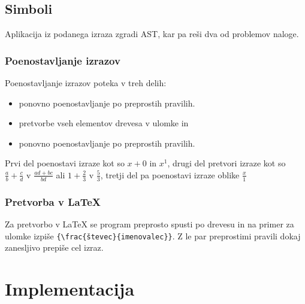 \documentclass[12pt]{report}
\begin{document}
	\section{Simboli}
	\label{symbol}
		Aplikacija iz podanega izraza zgradi AST, kar pa reši dva od problemov naloge.
			\subsection{Poenostavljanje izrazov}
				Poenostavljanje izrazov poteka v treh delih:
				\begin{itemize}
					\item ponovno poenostavljanje po preprostih pravilih.
					\item pretvorbe vseh elementov drevesa v ulomke in
					\item ponovno poenostavljanje po preprostih pravilih.
				\end{itemize}
				Prvi del poenostavi izraze kot so $ x + 0 $ in $ x^1 $, drugi del pretvori izraze kot so $ \frac{a}{b} + \frac{c}{d} $ v $ \frac{ad + bc}{bd} $ ali $ 1 + \frac{2}{3} $ v $ \frac{5}{3} $, tretji del pa poenostavi izraze oblike $ \frac{x}{1} $
			\subsection{Pretvorba v \LaTeX{}}
				Za pretvorbo v \LaTeX{} se program preprosto spusti po drevesu in na primer za ulomke izpiše \texttt{\{\textbackslash frac\{števec\}\{imenovalec\}\}}. Z le par preprostimi pravili dokaj zanesljivo prepiše cel izraz.
\clearpage			
\chapter{Implementacija}
\label{impl}
\end{document}
